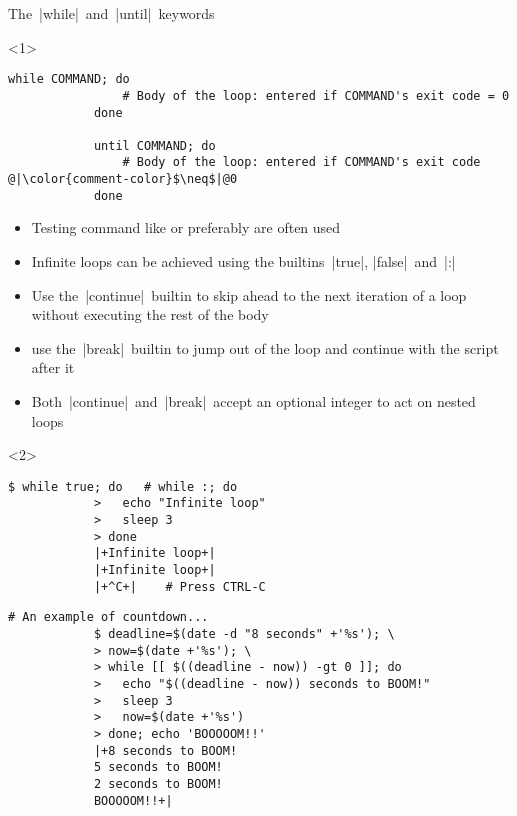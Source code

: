 \begin{frame}[fragile]{The \,\bash|while|\, and \,\bash|until|\, keywords}
    \begin{onlyenv}<1>
        \begin{lstlisting}[style=MyBash, numbers=none]
            while COMMAND; do
                # Body of the loop: entered if COMMAND's exit code = 0
            done
            
            until COMMAND; do
                # Body of the loop: entered if COMMAND's exit code @|\color{comment-color}$\neq$|@0
            done
        \end{lstlisting}
        \bigskip
        \begin{itemize}
            \item Testing command like \bash{[} or preferably \bash{[[} are often used
            \item Infinite loops can be achieved using the builtins \,\bash|true|, \bash|false|\, and \,\bash|:|
            \item Use the \,\bash|continue|\, builtin to skip ahead to the next iteration of a loop without executing the rest of the body
            \item use the \,\bash|break|\, builtin to jump out of the loop and continue with the script after it
            \item Both \,\bash|continue|\, and \,\bash|break|\, accept an optional integer to act on nested loops
        \end{itemize}
    \end{onlyenv}
    \begin{onlyenv}<2>
        \begin{lstlisting}[style=MyBash]
            $ while true; do   # while :; do
            >   echo "Infinite loop"
            >   sleep 3
            > done
            |+Infinite loop+|
            |+Infinite loop+|
            |+^C+|    # Press CTRL-C
        \end{lstlisting}
        \medskip
        \begin{lstlisting}[style=MyBash]
            # An example of countdown...
            $ deadline=$(date -d "8 seconds" +'%s'); \
            > now=$(date +'%s'); \
            > while [[ $((deadline - now)) -gt 0 ]]; do
            >   echo "$((deadline - now)) seconds to BOOM!"
            >   sleep 3
            >   now=$(date +'%s')
            > done; echo 'BOOOOOM!!'
            |+8 seconds to BOOM!
            5 seconds to BOOM!
            2 seconds to BOOM!
            BOOOOOM!!+|
        \end{lstlisting}
    \end{onlyenv}
\end{frame}
